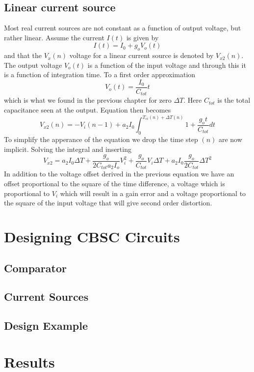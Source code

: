 \subsection{Linear current source}
Most real current sources are not constant as a function of output
voltage, but rather linear. Assume the current $I(t)$ is given by
\begin{equation}
I(t) = I_0 + g_oV_o(t)
\end{equation}
and that the $V_x(n)$ voltage for a linear current source is denoted by
$V_{x2}(n)$. The output voltage $V_o(t)$ is a function of the input
voltage and through this it is a function of integration time. To a first order approximation
\begin{equation}
V_o(t) = \frac{I_0}{C_{tot}}t
\end{equation}
which is what we found in the previous chapter for zero $\Delta T$. Here $C_{tot}$ is the total
capacitance seen at the output.
Equation  then becomes
\begin{equation}
\label{eq:vxlc}
V_{x2}(n) = -V_i(n-1) + a_2I_0\int_0^{T_{vi}(n) + \Delta T(n)}{ 1 +  \frac{g_o t}{C_{tot}}  dt} 
\end{equation}
To simplify the apperance of the equation we drop the time step $(n)$
are now implicit. 
Solving the integral and inserting 
\begin{equation} 
V_{x2} = a_2I_0\Delta T + \frac{g_o}{2C_{tot}a_2I_o}V_i^2 + \frac{g_o}{C_{tot}}V_i\Delta
T + a_2I_0\frac{g_o}{2C_{tot}}\Delta T^2
\end{equation} 
In addition to the voltage offset derived in the previous equation we
have an offset proportional to the square of the time difference, a
voltage which is proportional to $V_i$ which will result in a gain
error and a voltage proportional to the square of the input voltage
that will give second order distortion. 



\section{Designing CBSC Circuits}

\subsection{Comparator}
\subsection{Current Sources}
\subsection{Design Example}


\section{Results}


